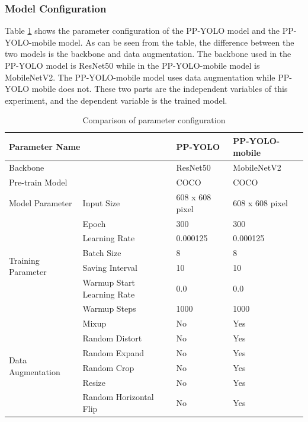 \documentclass[journal,article,submit,moreauthors,pdftex]{Definitions/mdpi}
\begin{document}
\subsubsection{Model Configuration}

Table \ref{tbl:Parameter} shows the parameter configuration of the PP-YOLO model and the PP-YOLO-mobile model. As can be seen from the table, the difference between the two models is the backbone and data augmentation. The backbone used in the PP-YOLO model is ResNet50 while in the PP-YOLO-mobile model is MobileNetV2. The PP-YOLO-mobile model uses data augmentation while PP-YOLO mobile does not. These two parts are the independent variables of this experiment, and the dependent variable is the trained model.

\begin{table}[htbp]
\centering
\caption{Comparison of parameter configuration}
\begin{tabular}{llll} 
\toprule
\multicolumn{2}{l}{\textbf{Parameter Name}}&\textbf{PP-YOLO}&\textbf{PP-YOLO-mobile}\\
\midrule
\multicolumn{2}{l}{Backbone} & ResNet50 & MobileNetV2 \\
\multicolumn{2}{l}{Pre-train Model} & COCO & COCO \\
\cmidrule(r){1-4}

\multirow{1}{*}{Model Parameter} 
& Input Size & 608 x 608 pixel  & 608 x 608 pixel  \\
\cmidrule(r){1-4}

\multirow{6}{*}{Training Parameter} 
& Epoch& 300  & 300  \\
& Learning Rate & 0.000125 & 0.000125  \\
& Batch Size & 8 & 8 \\
& Saving Interval & 10 & 10 \\
& Warmup Start Learning Rate & 0.0 & 0.0 \\
& Warmup Steps & 1000 & 1000 \\
\cmidrule(r){1-4}

\multirow{6}{*}{Data Augmentation} 
& Mixup& No  & Yes  \\
& Random Distort & No & Yes  \\
& Random Expand & No & Yes \\
& Random Crop  & No & Yes \\
& Resize & No & Yes \\
& Random Horizontal Flip & No & Yes \\

\bottomrule
\end{tabular}
\label{tbl:Parameter}
\end{table}
\end{document}
